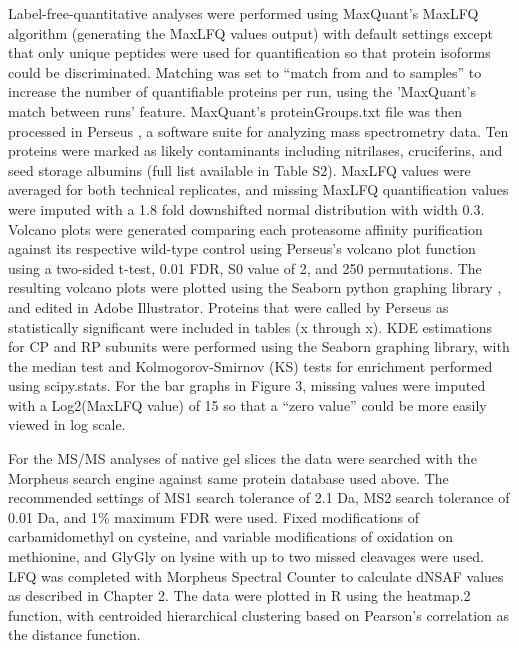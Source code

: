 Label-free-quantitative analyses were performed using MaxQuant’s MaxLFQ \citep{cox14} algorithm (generating the MaxLFQ values output) with default settings except that only unique peptides were used for quantification so that protein isoforms could be discriminated.  Matching was set to “match from and to samples” to increase the number of quantifiable proteins per run, using the 'MaxQuant’s match between runs' feature. MaxQuant’s proteinGroups.txt file was then processed in Perseus \citep{tyanova16}, a software suite for analyzing mass spectrometry data. Ten proteins were marked as likely contaminants including nitrilases, cruciferins, and seed storage albumins (full list available in Table S2). MaxLFQ values were averaged for both technical replicates, and missing MaxLFQ quantification values were imputed with a 1.8 fold downshifted normal distribution with width 0.3. Volcano plots were generated comparing each proteasome affinity purification against its respective wild-type control using Perseus’s volcano plot function using a two-sided t-test, 0.01 FDR, S0 value of 2, and 250 permutations. The resulting volcano plots were plotted using the Seaborn python graphing library \citep{tyanova16, waskom16}, and edited in Adobe Illustrator. Proteins that were called by Perseus as statistically significant were included in tables (x through x). KDE estimations for CP and RP subunits were performed using the Seaborn graphing library, with the median test and Kolmogorov-Smirnov (KS) tests for enrichment performed using scipy.stats. For the bar graphs in Figure 3, missing values were imputed with a Log2(MaxLFQ value) of 15 so that a “zero value” could be more easily viewed in log scale.

For the MS/MS analyses of native gel slices the data were searched with the Morpheus search engine \citep{wenger13} against same protein database used above. The recommended settings of MS1 search tolerance of 2.1 Da, MS2 search tolerance of 0.01 Da, and 1\% maximum FDR were used.  Fixed modifications of carbamidomethyl on cysteine, and variable modifications of oxidation on methionine, and GlyGly on lysine with up to two missed cleavages were used. LFQ was completed with Morpheus Spectral Counter \citep{gemperline16} to calculate dNSAF values as described in Chapter 2. The data were plotted in R using the heatmap.2 function, with centroided hierarchical clustering based on Pearson’s correlation as the distance function.

